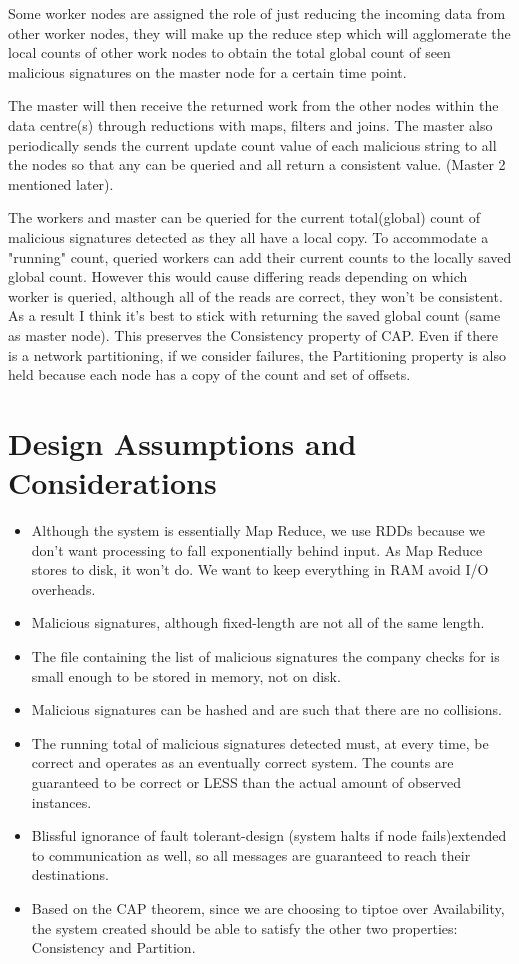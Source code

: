 \documentclass[11pt]{article}
\begin{document}
Some worker nodes are assigned the role of just reducing the incoming
data from other worker nodes, they will make up the reduce step which
will agglomerate the local counts of other work nodes to obtain the total
global count of seen malicious signatures on the master node for a certain
time point.

The master will then receive the returned work from the other 
nodes within the data centre(s) through reductions with maps,
filters and joins. The master also periodically sends the current
update count value of each malicious string to all the nodes
so that any can be queried and all return a consistent
value. (Master 2 mentioned later).

The workers and master can be queried for the current total(global) count of
malicious signatures detected as they all have a local copy.  To accommodate 
a "running" count, queried  workers can add their current counts to the 
locally saved global count. However this would cause differing reads 
depending on which worker is queried, although all of the reads are correct, 
they won't be consistent. As a result I think it's best to stick with 
returning the saved global count (same as master node). This preserves the 
Consistency property of CAP. Even if there is a network partitioning, if we 
consider failures, the Partitioning property is also held because each node
has a copy of the count and set of offsets.

\section{Design Assumptions and Considerations}
\begin{itemize}
\itemsep0em 
\item Although the system is essentially Map Reduce, we use RDDs because
we don't want processing to fall exponentially
behind input. As Map Reduce stores to disk, it won't do. 
We want to keep everything in RAM avoid I/O overheads.
\item Malicious signatures, although fixed-length are not all of
the same length.
\item The file containing the list of malicious
signatures the company checks for is small enough to be
stored in memory, not on disk.
\item Malicious signatures can be hashed and are such that there are no collisions.
\item The running total of malicious signatures detected must, at
every time, be correct and operates as an eventually correct 
system. The counts are guaranteed to be correct
or LESS than the actual amount of observed instances. 
\item Blissful ignorance of fault tolerant-design (system halts if node 
fails)extended to
communication as well, so all messages are guaranteed to reach their 
destinations.
\item Based on the CAP theorem, since we are choosing to 
tiptoe over Availability, the system created should be able
to satisfy the other two properties: Consistency and Partition.
\end{itemize}
\end{document}
